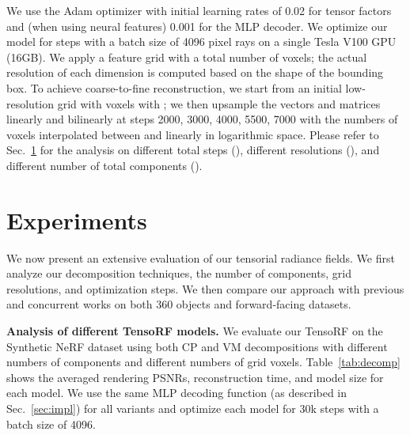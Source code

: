 \documentclass[runningheads]{llncs}
\newcommand{\boldstartspace}[1]{\vspace{0.1in}\noindent\textbf{#1}}
\begin{document}
We use the Adam optimizer \cite{adam} with initial learning rates of 0.02 for tensor factors and (when using neural features) 0.001 for the MLP decoder.
We optimize our model for  steps with a batch size of 4096 pixel rays on a single Tesla V100 GPU (16GB).
We apply a feature grid with a total number of  voxels; the actual resolution of each dimension is computed based on the shape of the bounding box. 
To achieve coarse-to-fine reconstruction, we start from an initial low-resolution grid with  voxels with ; we then
 upsample the vectors and matrices linearly and bilinearly at steps 2000, 3000, 4000, 5500, 7000 with the numbers of voxels interpolated between  and  linearly in logarithmic space. 
 Please refer to Sec.~\ref{sec:exp} for the analysis on different total steps (), different resolutions (), and different number of total components ().
 





































\section{Experiments}
\label{sec:exp}
We now present an extensive evaluation of our tensorial radiance fields. We first analyze our decomposition techniques, the number of components, grid resolutions, and optimization steps. We then compare our approach with previous and concurrent works on both 360 objects and forward-facing datasets.

\boldstartspace{Analysis of different TensoRF models.}
We evaluate our TensoRF on the Synthetic NeRF dataset \cite{mildenhall2020nerf} using both CP and VM decompositions with different numbers of components and different numbers of grid voxels.
Table~\ref{tab:decomp} shows the averaged rendering PSNRs, reconstruction time, and model size for each model. We use the same MLP decoding function (as described in Sec.~\ref{sec:impl}) for all variants and optimize each model for 30k steps with a batch size of 4096.
\end{document}
